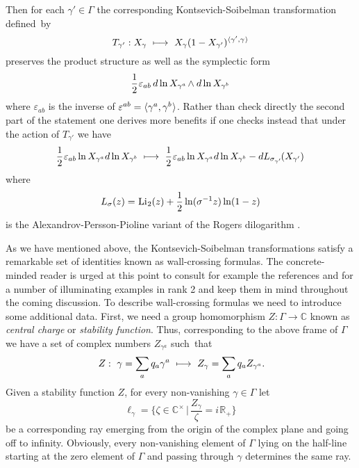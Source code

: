 \documentclass[11pt]{amsart}
\theoremstyle{remark}
\theoremstyle{remark}
\theoremstyle{definition}
\theoremstyle{definition}
\theoremstyle{definition}
\newcommand{\0}{{\scriptstyle 0'}} %
\newcommand{\1}{{\scriptstyle 1'}}
\newcommand{\pt}{\hspace{1pt}} %
\newcommand{\hp}{\hspace{0.5pt}} %
\newcommand{\npt}{\hspace{-1pt}} %
\newcommand{\Li}{\hp\mbox{Li}\hp}
\begin{document}
Then for each $\gamma' \in \Gamma$ the corresponding Kontsevich-Soibelman transformation defined~by
\begin{equation}
T_{\gamma'} : X_{\gamma} \ \longmapsto \ X_{\gamma}(1-X_{\gamma'})^{\langle\gamma',\gamma\hp\rangle}
\end{equation}
preserves the product structure as well as the symplectic form 
\begin{equation}
\frac{1}{2} \hp \varepsilon_{ab} \, d\ln X_{\gamma^{\smash a}} \npt \wedge d\ln X_{\gamma^{\smash b}}
\end{equation}
where $\varepsilon_{ab}$ is  the inverse of $\varepsilon^{ab} = \langle \gamma^a,\gamma^b \hp \rangle$. Rather than check directly the second part of the statement one derives more benefits if one checks instead that under the action of $T_{\gamma'}$ we have 
\begin{equation} \label{KS/1-f-pot}
\frac{1}{2} \hp \varepsilon_{ab} \ln X_{\gamma^{\smash a}} d\ln X_{\gamma^{\smash b}} 
\ \longmapsto \ 
\frac{1}{2} \hp \varepsilon_{ab} \ln X_{\gamma^{\smash a}} d\ln X_{\gamma^{\smash b}} - d L_{\sigma_{\gamma'}}\npt(X_{\gamma'})
\end{equation}
where 
\begin{equation}
L_{\sigma}(z) = \Li_2(z) + \frac{1}{2} \ln (\sigma^{-1}z) \ln(1-z)
\end{equation}
is the Alexandrov-Persson-Pioline variant of the Rogers dilogarithm \cite{MR2935636}. 

As we have mentioned above, the Kontsevich-Soibelman transformations satisfy a remarkable set of identities known as wall-crossing formulas. The concrete-minded reader is urged at this point to consult for example the references \cite{Kontsevich:2008fj} and \cite{MR2672801} for a number of illuminating examples in rank 2 and keep them in mind throughout the coming discussion. To describe wall-crossing formulas we need to introduce some additional data. First, we need a group homomorphism $Z : \Gamma \rightarrow \mathbb{C}$ known as \textit{central charge} or \textit{stability function}. Thus, corresponding to the above frame of $\Gamma$ we have a set of complex numbers $Z_{\gamma^a}$ such~that
\begin{equation}
Z : \ \gamma = \sum_a q_a \gamma^a 
\ \longmapsto \ 
Z_{\gamma} = \sum_a q_a Z_{\gamma^a} \rlap{.}
\end{equation}
Given a stability function $Z$, for every non-vanishing $\gamma \in \Gamma$ let
\begin{equation}
\ell_{\gamma} = \{ \zeta \in \mathbb{C}^{\times} \, | \, \frac{Z_{\gamma}}{\zeta} = i \pt \mathbb{R}_+ \}
\end{equation}
be a corresponding ray emerging from the origin of the complex plane and going off to infinity. Obviously, every non-vanishing element of $\Gamma$ lying on the half-line starting at the zero element of $\Gamma$ and passing through $\gamma$ determines the same ray. 
\end{document}
